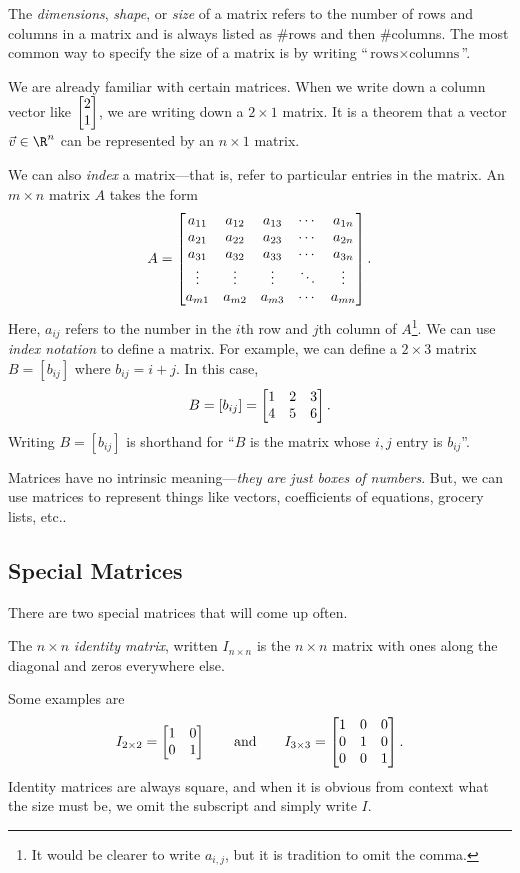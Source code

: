 	The \emph{dimensions}, \emph{shape}, or \emph{size} of a matrix refers
	to the number of rows and columns in a matrix and is always listed
	as $\#$rows and then $\#$columns. The most common way to specify the
	size of a matrix is by writing ``$\text{rows}\times\text{columns}$''.

	We are already familiar with certain matrices. When we write down
	a column vector like $\mat{2\\1}$, we are writing down a $2\times 1$ matrix.
	It is a theorem that a vector $\vec v\in\R^n$ can be represented by an $n\times 1$
	matrix.

	We can also \emph{index} a matrix---that is, refer to particular entries in the matrix.
	An $m\times n$ matrix $A$ takes the form
	\[
		A = \begin{bmatrix}
			a_{11}&a_{12}&a_{13}&\cdots& a_{1n}\\
			a_{21}&a_{22}&a_{23}&\cdots& a_{2n}\\
			a_{31}&a_{32}&a_{33}&\cdots& a_{3n}\\
			\vdots&\vdots&\vdots&\ddots&\vdots\\
			a_{m1}&a_{m2}&a_{m3}&\cdots& a_{mn}\\
		\end{bmatrix}.
	\]
	Here, $a_{ij}$ refers to the number in the $i$th row and $j$th column of $A$\footnote{
	It would be clearer to write $a_{i,j}$, but it is tradition to omit the comma.}. We can
	use \emph{index notation} to define a matrix. For example,
	we can define a $2\times 3$ matrix $B=[b_{ij}]$ where $b_{ij}=i+j$.  In this case,
	\[
		B=[b_{ij}] = \mat{1&2&3\\4&5&6}.
	\]
	Writing $B=[b_{ij}]$ is shorthand for ``$B$ is the matrix whose $i,j$ entry is $b_{ij}$''.

	\bigskip
	Matrices have no intrinsic meaning---\emph{they are just boxes of numbers}.
	But, we can use matrices to represent things like vectors, coefficients of
	equations, grocery lists, etc..

\subsection{Special Matrices}
	There are two special matrices that will come up often.
	\begin{definition}
		The $n\times n$ \emph{identity matrix}, written $I_{n\times n}$ is the $n\times n$
		matrix with ones along the diagonal and zeros everywhere else.
	\end{definition}
	Some examples are
	\[
		I_{2\times 2}=\mat{1&0\\0&1}\qquad\text{and}\qquad I_{3\times 3}=\mat{1&0&0\\0&1&0\\0&0&1}.
	\]
	Identity matrices are always square, and when it is obvious from context what
	the size must be, we omit the subscript and simply write $I$.

